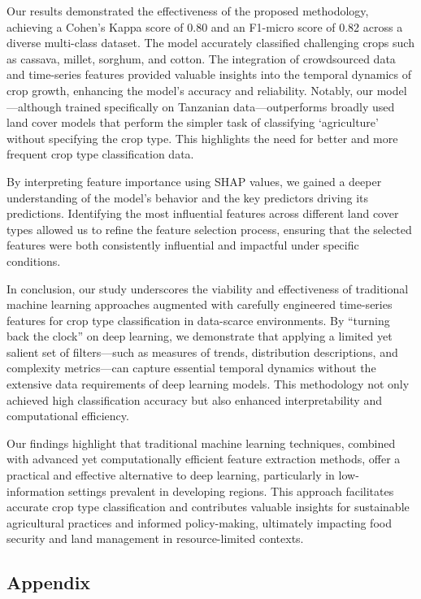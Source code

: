 \documentclass[
]{article}
\begin{document}
Our results demonstrated the effectiveness of the proposed methodology,
achieving a Cohen's Kappa score of 0.80 and an F1-micro score of 0.82
across a diverse multi-class dataset. The model accurately classified
challenging crops such as cassava, millet, sorghum, and cotton. The
integration of crowdsourced data and time-series features provided
valuable insights into the temporal dynamics of crop growth, enhancing
the model's accuracy and reliability. Notably, our model---although
trained specifically on Tanzanian data---outperforms broadly used land
cover models that perform the simpler task of classifying `agriculture'
without specifying the crop type. This highlights the need for better
and more frequent crop type classification data.

By interpreting feature importance using SHAP values, we gained a deeper
understanding of the model's behavior and the key predictors driving its
predictions. Identifying the most influential features across different
land cover types allowed us to refine the feature selection process,
ensuring that the selected features were both consistently influential
and impactful under specific conditions.

In conclusion, our study underscores the viability and effectiveness of
traditional machine learning approaches augmented with carefully
engineered time-series features for crop type classification in
data-scarce environments. By ``turning back the clock'' on deep
learning, we demonstrate that applying a limited yet salient set of
filters---such as measures of trends, distribution descriptions, and
complexity metrics---can capture essential temporal dynamics without the
extensive data requirements of deep learning models. This methodology
not only achieved high classification accuracy but also enhanced
interpretability and computational efficiency.

Our findings highlight that traditional machine learning techniques,
combined with advanced yet computationally efficient feature extraction
methods, offer a practical and effective alternative to deep learning,
particularly in low-information settings prevalent in developing
regions. This approach facilitates accurate crop type classification and
contributes valuable insights for sustainable agricultural practices and
informed policy-making, ultimately impacting food security and land
management in resource-limited contexts.

\newpage

\hypertarget{appendix}{%
\subsection{Appendix}\label{appendix}}
\end{document}
